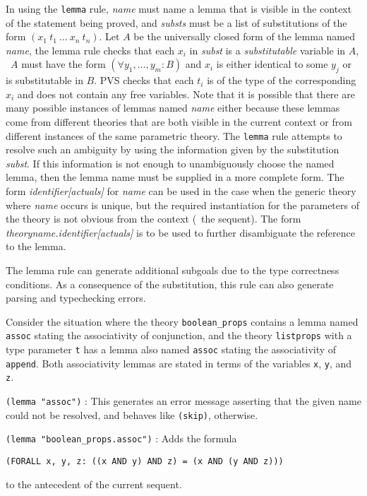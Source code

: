 \documentclass[12pt]{book}
\makeatletter
\newcommand{\indtt}[1]{\texttt{#1}\index{#1@{\texttt{#1}}}}  %
\newenvironment{usage}[1]{\item[usage:\hspace*{-0.175in}]#1\begin{description}\setlength{\itemindent}{-0.2in}\setlength{\itemsep}{0.1in}}{\end{description}}
\makeatother
\begin{document}
\begin{description}
In using the \indtt{lemma} rule, \emph{name} must name a lemma that is
visible in the context of the statement being proved, and \emph{substs}
must be a list of substitutions of the form $(x_1\ t_1\ \ldots\ x_n\
t_n)$.  Let $A$ be the universally closed form of the lemma named \emph{name}, the lemma rule checks that each $x_i$ in \emph{subst} is a
\emph{substitutable} variable in $A$, \ie\ $A$ must have the form
$(\forall y_1,\ldots, y_m : B)$ and $x_i$ is either identical to some
$y_j$ or is substitutable in $B$.  PVS checks that each $t_i$ is
of the type of the corresponding $x_i$ and does not contain any free
variables.  Note that it is possible that there are many possible
instances of lemmas named \emph{name} either because these lemmas come
from different theories that are both visible in the current context or
from different instances of the same parametric theory.  The \indtt{lemma}
rule attempts to resolve such an ambiguity by using the information
given by the substitution \emph{subst}.  If this information is not
enough to unambiguously choose the named lemma, then the lemma name must
be supplied in a more complete form.  The form \emph{identifier[actuals]} for \emph{name} can be used in the case when the
generic theory where  \emph{name} occurs is unique, but the required
instantiation for the parameters of the theory is not obvious from the
context (\ie\ the sequent).  The
form \emph{theoryname.identifier[actuals]} is to be used to further
disambiguate the reference to the lemma.

The lemma rule can generate additional subgoals due to the type
correctness conditions.  As a consequence of the substitution,
this rule can also generate parsing and typechecking errors.

\begin{usage}
{\hspace*{0.2in}Consider the situation where the theory
\texttt{boolean\_props} contains a lemma named \texttt{assoc} stating the
associativity of conjunction, and the theory \texttt{listprops} with a
type parameter \texttt{t} has a lemma also named \texttt{assoc} stating
the associativity of \texttt{append}.  Both associativity lemmas are
stated in terms of the variables \texttt{x}, \texttt{y}, and \texttt{z}.}

\item[\texttt{(lemma "assoc")}] : This generates an error message asserting
that the given name could not be resolved, and behaves like \texttt{(skip)}, otherwise.

\item[\texttt{(lemma "boolean\_props.assoc")}] : Adds the formula
\begin{center}
\texttt{(FORALL x, y, z:\ ((x AND y) AND z) = (x AND (y AND z)))}
\end{center}
to the antecedent of the current sequent.


\end{usage}
\end{description}
\end{document}
